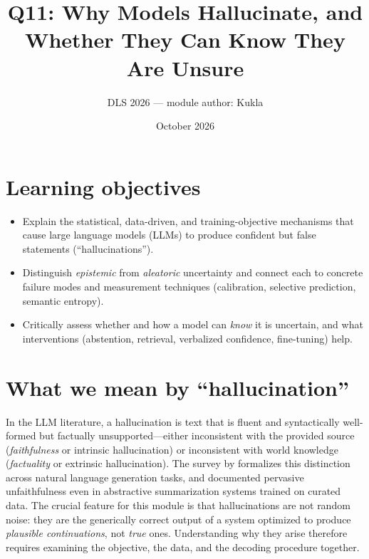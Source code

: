 \documentclass[11pt]{article}
\title{Q11: Why Models Hallucinate, and Whether They Can Know They Are Unsure}
\author{DLS 2026 --- module author: Kukla}
\date{October 2026}
\begin{document}
\maketitle

\section*{Learning objectives}
\begin{itemize}[leftmargin=*]
  \item Explain the statistical, data-driven, and training-objective mechanisms that cause large language models (LLMs) to produce confident but false statements (``hallucinations'').
  \item Distinguish \emph{epistemic} from \emph{aleatoric} uncertainty and connect each to concrete failure modes and measurement techniques (calibration, selective prediction, semantic entropy).
  \item Critically assess whether and how a model can \emph{know} it is uncertain, and what interventions (abstention, retrieval, verbalized confidence, fine-tuning) help.
\end{itemize}

\section{What we mean by ``hallucination''}
In the LLM literature, a hallucination is text that is fluent and syntactically well-formed but factually unsupported---either inconsistent with the provided source (\emph{faithfulness} or intrinsic hallucination) or inconsistent with world knowledge (\emph{factuality} or extrinsic hallucination). The survey by \citet{ji2023survey} formalizes this distinction across natural language generation tasks, and \citet{maynez2020faithfulness} documented pervasive unfaithfulness even in abstractive summarization systems trained on curated data. The crucial feature for this module is that hallucinations are not random noise: they are the generically correct output of a system optimized to produce \emph{plausible continuations}, not \emph{true} ones. Understanding why they arise therefore requires examining the objective, the data, and the decoding procedure together.
\end{document}
